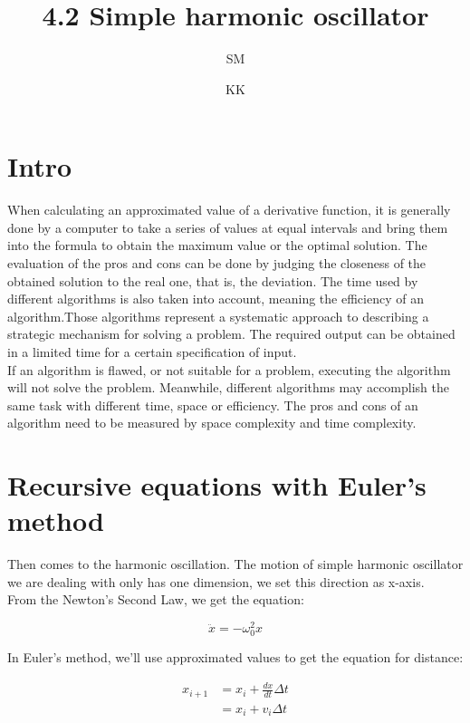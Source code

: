 \documentclass[12pt]{article}
\begin{document}
\title{4.2 Simple harmonic oscillator}
\author{SM \and KK}
\maketitle


\section{Intro}
When calculating an approximated value of a derivative function, it is generally done by a computer to take a series of values at equal intervals and bring them into the formula to obtain the maximum value or the optimal solution. The evaluation of the pros and cons can be done by judging the closeness of the obtained solution to the real one, that is, the deviation. The time used by different algorithms is also taken into account, meaning the efficiency of an algorithm.Those algorithms represent a systematic approach to describing a strategic mechanism for solving a problem. The required output can be obtained in a limited time for a certain specification of input.\\

If an algorithm is flawed, or not suitable for a problem, executing the algorithm will not solve the problem. Meanwhile, different algorithms may accomplish the same task with different time, space or efficiency. The pros and cons of an algorithm need to be measured by space complexity and time complexity.



\section{Recursive equations with Euler's method}
Then comes to the harmonic oscillation. The motion of simple harmonic oscillator we are dealing with only has one dimension, we set this direction as x-axis. \\

From the Newton's Second Law, we get the equation: 

\begin{equation}
    \ddot{x} = -\omega_{0}^2 x
\end{equation} 

In Euler's method, we'll use approximated values to  get the equation for distance: 

\begin{align}
    x_{i+1} &= x_{i} + \frac{dx}{dt} \Delta t \\
            &= x_{i} + v_{i} \Delta t \nonumber 
\end{align}
\end{document}
